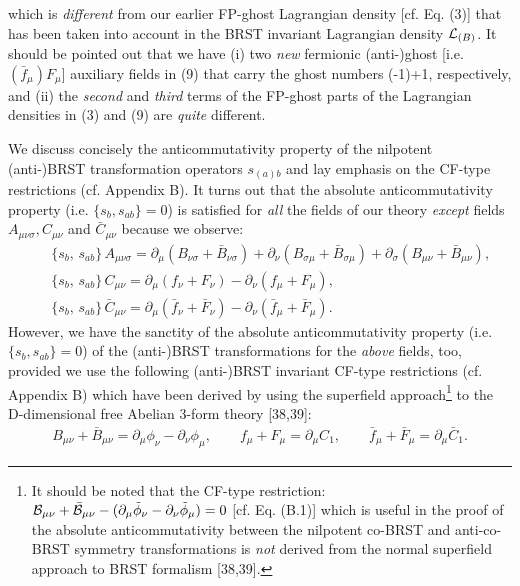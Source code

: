 \documentclass[12pt]{article}
\begin{document}
which is {\it different} from our earlier FP-ghost Lagrangian  density [cf. Eq. (3)] that has 
been taken into account in the BRST invariant Lagrangian density ${\cal L}_{(B)}$.
It should be pointed out that we have (i) two {\it new} fermionic (anti-)ghost [i.e. $(\bar f_\mu)F_\mu $]
auxiliary fields in (9) that carry the ghost numbers (-1)+1, respectively, and (ii) the {\it second} and {\it third} terms of the FP-ghost parts of
the Lagrangian densities in (3) and (9) are {\it quite} different.





We  discuss concisely  the anticommutativity property of the nilpotent (anti-)BRST transformation operators $s_{(a)b}$ 
and lay emphasis on the CF-type restrictions (cf. Appendix B). 
It turns out that the absolute anticommutativity property (i.e. $\{s_b, s_{ab}\} = 0$) is satisfied for {\it all} the fields 
of our theory {\it except} fields $A_{\mu\nu\sigma}, C_{\mu\nu}$ and $\bar C_{\mu\nu}$ because we observe: 
 \begin{eqnarray}\label{10}
&& \{s_b, \,s_{ab}\}\, A_{\mu\nu\sigma} = \partial_\mu (B_{\nu\sigma} +  \bar B_{\nu\sigma}) + \partial_\nu (B_{\sigma\mu}
 +  \bar B_{\sigma\mu}) + \partial_\sigma (B_{\mu\nu} +  \bar B_{\mu\nu}), \nonumber\\
 && \{s_b, \,s_{ab}\}\, C_{\mu\nu} = \partial_\mu (f_\nu +  F_\nu) - \partial_\nu (f_\mu + F_\mu), \nonumber\\
  && \{s_b, \, s_{ab}\}\,\bar C_{\mu\nu} = \partial_\mu (\bar f_\nu +  \bar F_\nu) - \partial_\nu (\bar f_\mu + \bar F_\mu).
\end{eqnarray}  
However, we have the sanctity of the absolute  anticommutativity property (i.e.  $\{s_b, s_{ab}\} = 0$) of
the (anti-)BRST transformations  for the {\it above} fields, too, provided we use the following (anti-)BRST invariant CF-type restrictions
(cf. Appendix B)
which have been derived by using the superfield approach\footnote{It should be noted that the CF-type restriction: 
${\cal B}_{\mu\nu} + \bar {\cal B}_{\mu\nu} - (\partial_\mu \tilde \phi_\nu  - \partial_\nu \tilde \phi_\mu) = 0 $ [cf. Eq. (B.1)] which
is useful in the proof of the absolute anticommutativity between the nilpotent co-BRST and anti-co-BRST symmetry transformations
is {\it not} derived from the normal superfield approach to BRST formalism [38,39]. }
 to the D-dimensional free Abelian 3-form theory [38,39]:
\begin{eqnarray}\label{11}
B_{\mu\nu} + \bar B_{\mu\nu} = \partial_\mu \phi_\nu  - \partial_\nu \phi_\mu, \qquad 
f_\mu + F_\mu  = \partial_\mu C_1, \qquad \bar f_\mu + \bar F_\mu  = \partial_\mu \bar C_1.
\end{eqnarray} 
\end{document}
